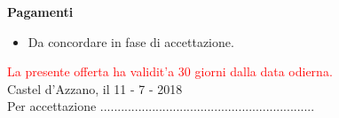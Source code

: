 \documentclass[a4paper]{article}
\begin{document}
                        \noindent\textbf{Pagamenti}
                        \begin{itemize}
                            \item Da concordare in fase di accettazione.
                        \end{itemize}

                        \textcolor{red}{La presente offerta ha validit'a 30 giorni dalla data odierna.}\\

                        Castel d'Azzano, il 11 - 7 - 2018
                        \vspace{1cm}\\
                        Per accettazione ..............................................................

                      
\end{document}
